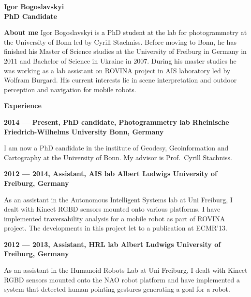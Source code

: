 \documentclass[a4paper,12pt,final]{memoir}
\newcommand{\Sep}{\vspace{1.5em}}
\newcommand{\SmallSep}{\vspace{0.5em}}
\newenvironment{AboutMe}
	{\ignorespaces\textbf{\color{Black} About me}}
	{\Sep\ignorespacesafterend}
\newcommand{\CVSection}[1]
	{\Large\textbf{#1}\par
	\SmallSep\normalsize\normalfont}
\newcommand{\CVItem}[1]
	{\textbf{\color{MidnightBlue} #1}}
\begin{document}
\framebreak{}


\Huge\bfseries {\color{MidnightBlue} Igor Bogoslavskyi} \\
\Large\bfseries  PhD Candidate \\

\normalsize\normalfont{}

\begin{AboutMe}
\newline
Igor Bogoslavskyi is a PhD student at the lab for photogrammetry at the
University of Bonn led by Cyrill Stachniss. Before moving to Bonn, he has
finished his Master of Science studies at the University of Freiburg in Germany
in 2011 and Bachelor of Science in Ukraine in 2007. During his master studies he
was working as a lab assistant on ROVINA project in AIS laboratory led by
Wolfram Burgard. His current interests lie in scene interpretation and outdoor
perception and navigation for mobile robots.
\end{AboutMe}

\CVSection{Experience}
\CVItem{2014 --- Present, PhD candidate, Photogrammetry lab
\newline Rheinische Friedrich-Wilhelms University Bonn, Germany}
\begin{compactitem}[\color{RoyalBlue}$\circ$]
\item I am now a PhD candidate in the institute of Geodesy, Geoinformation and
Cartography at the University of Bonn. My advisor is Prof.~Cyrill Stachniss.
\end{compactitem}
\SmallSep

\CVItem{2012 --- 2014, Assistant, AIS lab
\newline Albert Ludwigs University of Freiburg, Germany}
\begin{compactitem}[\color{RoyalBlue}$\circ$]
\item As an assistant in the Autonomous Intelligent Systems lab at Uni Freiburg,
I dealt with Kinect RGBD sensors mounted onto various platforms. I have
implemented traversability analysis for a mobile robot as part of ROVINA
project. The developments in this project let to a publication at ECMR'13.
\end{compactitem}
\SmallSep

\CVItem{2012 --- 2013, Assistant, HRL lab
\newline Albert Ludwigs University of Freiburg, Germany}
\begin{compactitem}[\color{RoyalBlue}$\circ$]
	\item As an assistant in the Humanoid Robots Lab at Uni Freiburg, I dealt with
	Kinect RGBD sensors mounted onto the NAO robot platform and have implemented a
	system that detected human pointing gestures generating a goal for a robot.
\end{compactitem}
\SmallSep
\end{document}

